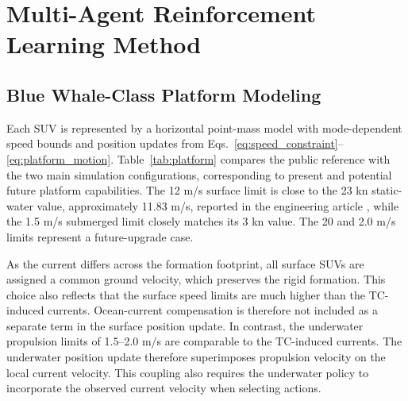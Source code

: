 \documentclass[a4paper,fleqn]{cas-dc}
\begin{document}
\section{Multi-Agent Reinforcement Learning Method}\label{sec:model}

\subsection{Blue Whale-Class Platform Modeling}

Each SUV is represented by a horizontal point-mass model with mode-dependent
speed bounds and position updates from
Eqs.~\eqref{eq:speed_constraint}--\eqref{eq:platform_motion}.
Table~\ref{tab:platform} compares the public reference with the two main
simulation configurations, corresponding to present and potential future
platform capabilities. The 12 m/s surface limit is close to the 23 kn static-water
value, approximately 11.83 m/s, reported in the engineering article
\citep{r28}, while the 1.5 m/s submerged limit closely matches its 3 kn value.
The 20 and 2.0 m/s limits represent a future-upgrade case.

As the current differs across the formation footprint, all surface SUVs are
assigned a common ground velocity, which preserves the rigid formation. This
choice also reflects that the surface speed limits are much higher than the
TC-induced currents. Ocean-current compensation is therefore not included as a
separate term in the surface position update. In contrast, the underwater
propulsion limits of 1.5--2.0 m/s are comparable to the TC-induced currents. The
underwater position update therefore superimposes propulsion velocity on the
local current velocity. This coupling also requires the underwater policy to
incorporate the observed current velocity when selecting actions.
\end{document}
